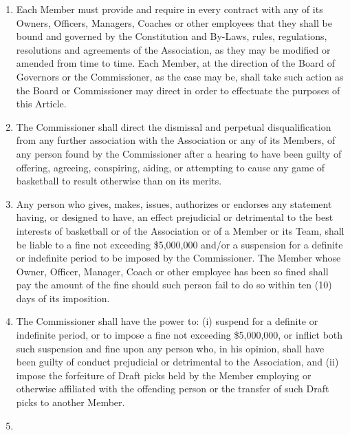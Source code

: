 \documentclass[]{book}
\begin{document}
\begin{enumerate}
\def\labelenumi{(\alph{enumi})}
\item
  Each Member must provide and require in every contract with any of its Owners, Officers, Managers, Coaches or other employees that they shall be bound and governed by the Constitution and By-Laws, rules, regulations, resolutions and agreements of the Association, as they may be modified or amended from time to time. Each Member, at the direction of the Board of Governors or the Commissioner, as the case may be, shall take such action as the Board or Commissioner may direct in order to effectuate the purposes of this Article.
\item
  The Commissioner shall direct the dismissal and perpetual disqualification from any further association with the Association or any of its Members, of any person found by the Commissioner after a hearing to have been guilty of offering, agreeing, conspiring, aiding, or attempting to cause any game of basketball to result otherwise than on its merits.
\item
  Any person who gives, makes, issues, authorizes or endorses any statement having, or designed to have, an effect prejudicial or detrimental to the best interests of basketball or of the Association or of a Member or its Team, shall be liable to a fine not exceeding \$5,000,000 and/or a suspension for a definite or indefinite period to be imposed by the Commissioner. The Member whose Owner, Officer, Manager, Coach or other employee has been so fined shall pay the amount of the fine should such person fail to do so within ten (10) days of its imposition.
\item
  The Commissioner shall have the power to: (i) suspend for a definite or indefinite period, or to impose a fine not exceeding \$5,000,000, or inflict both such suspension and fine upon any person who, in his opinion, shall have been guilty of conduct prejudicial or detrimental to the Association, and (ii) impose the forfeiture of Draft picks held by the Member employing or otherwise affiliated with the offending person or the transfer of such Draft picks to another Member.
\item

\end{enumerate}
\end{document}
